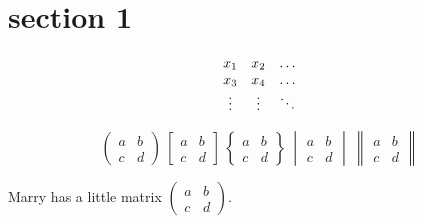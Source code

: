 \documentclass[12pt]{article}
\begin{document}
    \section{section 1}
    \[ \begin{array}[c]{ccc}
    x_1 & x_2 & \dots \\
    x_3 & x_4 & \dots \\
    \vdots & \vdots & \ddots
    \end{array} \]
    
    \[ \begin{pmatrix} a&b \\ c&d \end{pmatrix} \
        \begin{bmatrix} a&b \\ c&d \end{bmatrix} \
        \begin{Bmatrix} a&b \\ c&d \end{Bmatrix} \
        \begin{vmatrix} a&b \\ c&d \end{vmatrix} \
        \begin{Vmatrix} a&b \\ c&d \end{Vmatrix} \]
        
    Marry has a little matrix $ ( \begin{smallmatrix}
    a&b\\c&d \end{smallmatrix} ) $.
\end{document}
